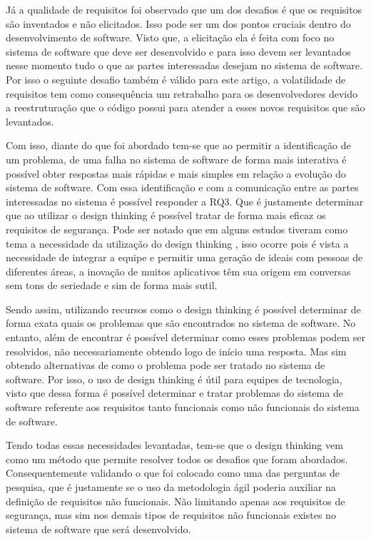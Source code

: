 \documentclass[a4paper,twoside]{article}
\begin{document}
Já a qualidade de requisitos foi observado que um dos desafios é que os requisitos são inventados e não elicitados. Isso pode ser um dos pontos cruciais dentro do desenvolvimento de software. Visto que, a elicitação ela é feita com foco no sistema de software que deve ser desenvolvido e para isso devem ser levantados nesse momento tudo o que as partes interessadas desejam no sistema de software. Por isso o seguinte desafio também é válido para este artigo, a volatilidade de requisitos tem como consequência um retrabalho para os desenvolvedores devido a reestruturação que o código possui para atender a esses novos requisitos que são levantados\cite{DBLP:conf/sac/PereiraPPMC21}.

Com isso, diante do que foi abordado tem-se que ao permitir a identificação de um problema, de uma falha no sistema de software de forma mais interativa é possível obter respostas mais rápidas e mais simples em relação a evolução do sistema de software. Com essa identificação e com a comunicação entre as partes interessadas no sistema é possível responder  a RQ3. Que é justamente determinar que ao utilizar o design thinking é possível tratar de forma mais eficaz os requisitos de segurança. Pode ser notado que em alguns estudos tiveram como tema a necessidade da utilização do design thinking , isso ocorre pois é vista a necessidade de integrar a equipe e permitir uma geração de ideais com pessoas de diferentes áreas, a inovação de muitos aplicativos têm sua origem em conversas sem tons de seriedade e sim de forma mais sutil\cite{DBLP:journals/internet/VetterliBUP13}. 

Sendo assim, utilizando recursos como o design thinking é possível determinar de forma exata quais os problemas que são encontrados no sistema de software. No entanto, além de encontrar é possível determinar como esses problemas podem ser resolvidos, não necessariamente obtendo logo de início uma resposta. Mas sim obtendo alternativas de como o problema pode ser tratado no sistema de software. Por isso, o uso de design thinking é útil para equipes de tecnologia, visto que dessa forma é possível determinar e tratar problemas do sistema de software referente aos requisitos tanto funcionais como não funcionais do sistema de software.

Tendo todas essas necessidades levantadas, tem-se que o design thinking vem como um método que permite resolver todos os desafios que foram abordados. Consequentemente validando o que foi colocado como uma das perguntas de pesquisa, que é justamente se o uso da metodologia ágil poderia auxiliar na definição de requisitos não funcionais. Não limitando apenas aos requisitos de segurança, mas sim nos demais tipos de requisitos não funcionais existes no sistema de software que será desenvolvido.
\end{document}
